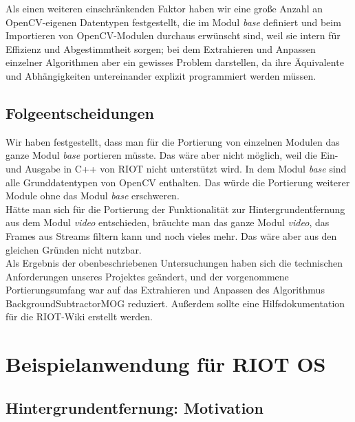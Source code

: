 \documentclass[10pt,a4paper]{article}
\begin{document}
Als einen weiteren einschränkenden Faktor haben wir eine große Anzahl an OpenCV-eigenen Datentypen festgestellt, die im Modul {\it base} definiert und beim Importieren von OpenCV-Modulen durchaus erwünscht sind, weil sie intern für Effizienz und Abgestimmtheit sorgen; bei dem Extrahieren und Anpassen einzelner Algorithmen aber ein gewisses Problem darstellen, da ihre Äquivalente und Abhängigkeiten untereinander explizit programmiert werden müssen.

\subsection{Folgeentscheidungen}

Wir haben festgestellt, dass man für die Portierung von einzelnen Modulen das ganze Modul {\it base} portieren müsste. Das wäre aber nicht möglich, weil die Ein- und Ausgabe in C++ von RIOT nicht unterstützt wird. In dem Modul {\it base} sind alle Grunddatentypen von OpenCV enthalten. Das würde die Portierung weiterer Module ohne das Modul {\it base} erschweren. \\

Hätte man sich für die Portierung der Funktionalität zur Hintergrundentfernung aus dem Modul {\it video} entschieden, bräuchte man das ganze Modul {\it video}, das Frames aus Streams filtern kann und noch vieles mehr. Das wäre aber aus den gleichen Gründen nicht nutzbar. \\

Als Ergebnis der obenbeschriebenen Untersuchungen haben sich die technischen Anforderungen unseres Projektes geändert, und der vorgenommene Portierungsumfang war auf das Extrahieren und Anpassen des Algorithmus BackgroundSubtractorMOG reduziert. Außerdem sollte eine Hilfsdokumentation für die RIOT-Wiki erstellt werden.

\newpage
\section{Beispielanwendung für RIOT OS}

\subsection{Hintergrundentfernung: Motivation}
\end{document}

